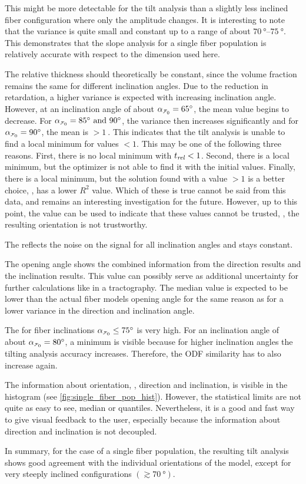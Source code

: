 This might be more detectable for the tilt analysis than a slightly less inclined fiber configuration where only the amplitude changes.
It is interesting to note that the variance is quite small and constant up to a range of about $\SIrange{70}{75}{\degree}$.
This demonstrates that the slope analysis for a single fiber population is relatively accurate with respect to the dimension used here.
\par
%
The relative thickness \trel{} should theoretically be constant, since the volume fraction remains the same for different inclination angles.
Due to the reduction in retardation, a higher variance is expected with increasing inclination angle.
However, at an inclination angle of about $\modelInc=\SI{65}{\degree}$, the mean value begins to decrease.
For $\modelInc=\SIlist{85;90}{\degree}$, the variance then increases significantly and for $\modelInc=\SI{90}{\degree}$, the mean is $>\SI{1}{}$.
This indicates that the tilt analysis is unable to find a local minimum for \trel{} values $<1$.
This may be one of the following three reasons.
First, there is no local minimum with $\textnormal{$t_\mathit{rel}$}<1$.
Second, there is a local minimum, but the optimizer is not able to find it with the initial values.
Finally, there is a local minimum, but the solution found with a \trel{} value $>1$ is a better choice, \ie{}, has a lower $R^2$ value.
Which of these is true cannot be said from this data, and remains an interesting investigation for the future.
However, up to this point, the \trel{} value can be used to indicate that these values cannot be trusted, \ie{}, the resulting orientation is not trustworthy.
\par
%
The \rvalue{} reflects the noise on the signal for all inclination angles and stays constant.
\par
%
The opening angle shows the combined information from the direction results and the inclination results.
This value can possibly serve as additional uncertainty for further calculations like in a tractography.
The median value is expected to be lower than the actual fiber models opening angle for the same reason as for a lower \bvariance{} variance in the direction and inclination angle.
\par
%
The \accvalue{} for fiber inclinations $\modelInc \leq \SI{75}{\degree}$ is very high.
For an inclination angle of about $\modelInc = \SI{80}{\degree}$, a minimum is visible because for higher inclination angles the tilting analysis accuracy increases.
Therefore, the \ac{ODF} similarity has to also increase again.
\par
%
The information about orientation, \ie{}, direction and inclination, is visible in the histogram (see \cref*{fig:single_fiber_pop_hist}).
However, the statistical limits are not quite as easy to see, \eg{} median or quantiles.
Nevertheless, it is a good and fast way to give visual feedback to the user, especially because the information about direction and inclination is not decoupled.
\par
%
In summary, for the case of a single fiber population, the resulting tilt analysis shows good agreement with the individual orientations of the model, except for very steeply inclined configurations $(\gtrsim \SI{70}{\degree})$.
%
%
%
